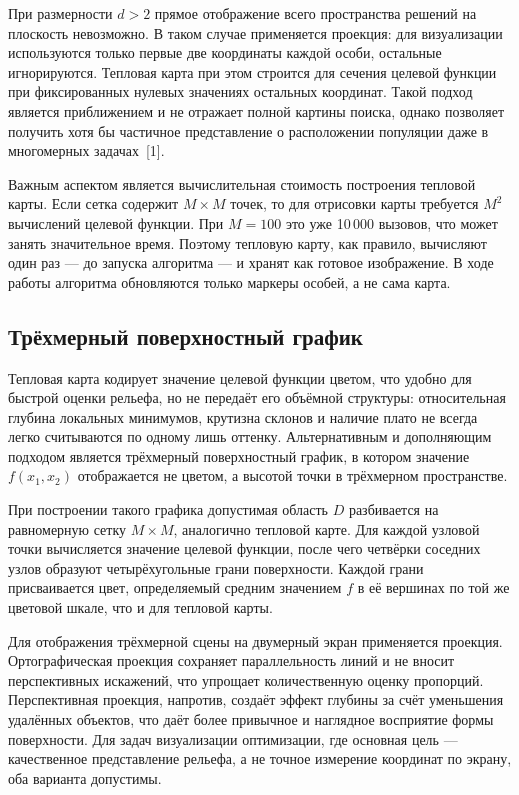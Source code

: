 \documentclass[14pt, russian]{scrartcl}
\begin{document}
При размерности $d > 2$ прямое отображение всего пространства решений
на плоскость невозможно. В таком случае применяется проекция: для
визуализации используются только первые две координаты каждой особи,
остальные игнорируются. Тепловая карта при этом строится для сечения
целевой функции при фиксированных нулевых значениях остальных
координат. Такой подход является приближением и не отражает полной
картины поиска, однако позволяет получить хотя бы частичное
представление о расположении популяции даже в многомерных задачах~[1].

Важным аспектом является вычислительная стоимость построения тепловой
карты. Если сетка содержит $M \times M$ точек, то для отрисовки карты
требуется $M^2$ вычислений целевой функции. При $M = 100$ это уже
10\,000 вызовов, что может занять значительное время. Поэтому тепловую
карту, как правило, вычисляют один раз --- до запуска алгоритма ---
и хранят как готовое изображение. В ходе работы алгоритма обновляются
только маркеры особей, а не сама карта.

\subsection{Трёхмерный поверхностный график}

Тепловая карта кодирует значение целевой функции цветом, что удобно
для быстрой оценки рельефа, но не передаёт его объёмной структуры:
относительная глубина локальных минимумов, крутизна склонов и наличие
плато не всегда легко считываются по одному лишь оттенку. Альтернативным
и дополняющим подходом является трёхмерный поверхностный график, в котором
значение $f(x_1, x_2)$ отображается не цветом, а высотой точки в
трёхмерном пространстве.

При построении такого графика допустимая область $D$ разбивается на
равномерную сетку $M \times M$, аналогично тепловой карте. Для каждой
узловой точки вычисляется значение целевой функции, после чего четвёрки
соседних узлов образуют четырёхугольные грани поверхности.
Каждой грани присваивается цвет, определяемый средним значением $f$
в её вершинах по той же цветовой шкале, что и для тепловой карты.

Для отображения трёхмерной сцены на двумерный экран применяется
проекция. Ортографическая проекция сохраняет параллельность линий и
не вносит перспективных искажений, что упрощает количественную оценку
пропорций. Перспективная проекция, напротив, создаёт эффект глубины
за счёт уменьшения удалённых объектов, что даёт более привычное и
наглядное восприятие формы поверхности. Для задач визуализации
оптимизации, где основная цель --- качественное представление рельефа,
а не точное измерение координат по экрану, оба варианта допустимы.
\end{document}
